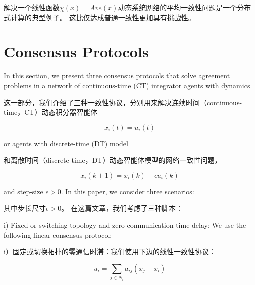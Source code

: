\documentclass{article}
\begin{document}
解决一个线性函数$\chi(x)=Ave(x)$动态系统网络的平均一致性问题是一个分布式计算的典型例子。
这比仅达成普通一致性更加具有挑战性。

\section{Consensus Protocols}
{\color[gray]{0.5}
\noindent In this section, we present three consensus protocols that solve agreement problems in a network of continuous-time (CT) integrator agents with dynamics
}

\noindent 这一部分，我们介绍了三种一致性协议，分别用来解决连续时间（continuous-time，CT）动态积分器智能体

\begin{equation}
    \dot{x}_i(t) = u_i(t)
    \tag{4}
    \label{4}
\end{equation}


{\color[gray]{0.5}
\noindent or agents with discrete-time (DT) model
}

\noindent 和离散时间（discrete-time，DT）动态智能体模型的网络一致性问题，

\begin{equation}
    x_i(k+1) = x_i(k)+\epsilon u_i(k)
    \tag{5}
    \label{5}
\end{equation}


{\color[gray]{0.5}
\noindent and step-size $\epsilon>0$. 
In this paper, we consider three scenarios:
}

\noindent 其中步长尺寸$\epsilon>0$。
在这篇文章，我们考虑了三种脚本：

{\color[gray]{0.5}
i) Fixed or switching topology and zero communication time-delay: We use the following linear consensus protocol:
}

i）固定或切换拓扑的零通信时滞：我们使用下边的线性一致性协议：

\begin{equation}
    u_i = \sum_{j\in N_i}a_{ij}(x_j-x_i)
    \tag{A1}
    \label{A1}
\end{equation}
\end{document}
